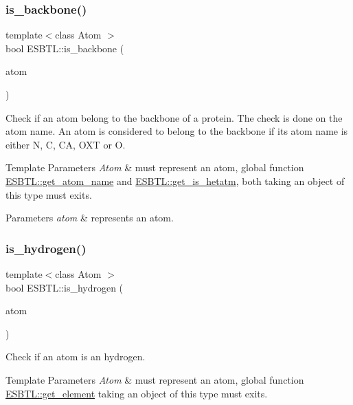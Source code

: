\subsubsection{\texorpdfstring{is\+\_\+backbone()}{is\_backbone()}}
{\footnotesize\ttfamily template$<$class Atom $>$ \\
bool E\+S\+B\+T\+L\+::is\+\_\+backbone (\begin{DoxyParamCaption}\item[{const Atom \&}]{atom }\end{DoxyParamCaption})}

Check if an atom belong to the backbone of a protein. The check is done on the atom name. An atom is considered to belong to the backbone if its atom name is either {\ttfamily N}, {\ttfamily C}, {\ttfamily CA}, {\ttfamily O\+XT} or {\ttfamily O}. 
\begin{DoxyTemplParams}{Template Parameters}
{\em Atom} & must represent an atom, global function \hyperlink{namespaceESBTL_a2a0153bcc07ae7f992d0087ea0574b2a}{E\+S\+B\+T\+L\+::get\+\_\+atom\+\_\+name} and \hyperlink{namespaceESBTL_a5127b779bbb76916a99d85f2ae7d5ff8}{E\+S\+B\+T\+L\+::get\+\_\+is\+\_\+hetatm}, both taking an object of this type must exits. \\
\hline
\end{DoxyTemplParams}

\begin{DoxyParams}{Parameters}
{\em atom} & represents an atom. \\
\hline
\end{DoxyParams}
\mbox{\label{namespaceESBTL_ac05e26083da51353c81b8a27f0ea5580}} 
\subsubsection{\texorpdfstring{is\+\_\+hydrogen()}{is\_hydrogen()}}
{\footnotesize\ttfamily template$<$class Atom $>$ \\
bool E\+S\+B\+T\+L\+::is\+\_\+hydrogen (\begin{DoxyParamCaption}\item[{const Atom \&}]{atom }\end{DoxyParamCaption})}

Check if an atom is an hydrogen. 
\begin{DoxyTemplParams}{Template Parameters}
{\em Atom} & must represent an atom, global function \hyperlink{namespaceESBTL_a0c43740d66a09673579487dc0dfe1634}{E\+S\+B\+T\+L\+::get\+\_\+element} taking an object of this type must exits. \\
\hline
\end{DoxyTemplParams}

